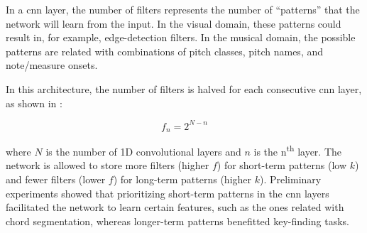 
In a \gls{cnn} layer, the number of filters represents the
number of ``patterns'' that the network will learn from the
input. In the visual domain, these patterns could result in,
for example, edge-detection filters. In the musical domain,
the possible patterns are related with combinations of pitch
classes, pitch names, and note/measure onsets.

In this architecture, the number of filters is halved for
each consecutive \gls{cnn} layer, as shown in
:

\begin{equation}
    \label{eq:number_of_filters}
    f_n = 2^{N - n}
\end{equation}

where $N$ is the number of 1D convolutional layers and $n$
is the n\textsuperscript{th} layer. The network is allowed
to store more filters (higher $f$) for short-term patterns
(low $k$) and fewer filters (lower $f$) for long-term
patterns (higher $k$). Preliminary experiments showed that
prioritizing short-term patterns in the \gls{cnn} layers
facilitated the network to learn certain features, such as
the ones related with chord segmentation, whereas
longer-term patterns benefitted key-finding tasks.
